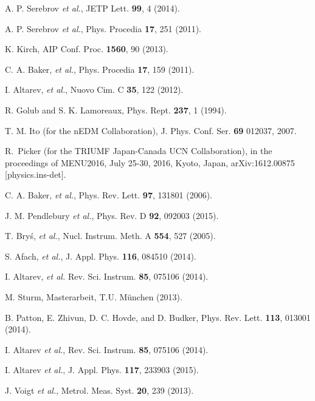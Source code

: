 \documentclass[review]{elsarticle}
\begin{document}

\begin{thebibliography}{00}

 A. P. Serebrov {\it et al.}, JETP Lett. {\bf 99}, 4
  (2014).

 A. P. Serebrov {\it et al.}, Phys. Procedia {\bf
  17}, 251 (2011).

 K. Kirch, AIP Conf. Proc. {\bf 1560}, 90 (2013).

 C. A. Baker, {\it et al.}, Phys. Procedia {\bf
  17}, 159 (2011).

 I. Altarev, {\it et al.}, Nuovo Cim. C {\bf
  35}, 122 (2012).

 R. Golub and S. K. Lamoreaux, Phys. Rept.  {\bf
  237}, 1 (1994).

 T. M. Ito (for the nEDM Collaboration),
  J. Phys. Conf. Ser. {\bf 69} 012037, 2007.

 R.~Picker (for the TRIUMF Japan-Canada UCN
  Collaboration), in the proceedings of MENU2016, July 25-30, 2016,
  Kyoto, Japan, arXiv:1612.00875 [physics.ins-det].

 C. A. Baker, {\it et al.}, Phys. Rev. Lett. {\bf
  97}, 131801 (2006).

 J. M. Pendlebury {\it et al.}, Phys. Rev. D
  {\bf 92}, 092003 (2015).

 T. Bry\'s, {\it et al.}, Nucl. Instrum. Meth. A
  {\bf 554}, 527 (2005).

 S. Afach, {\it et al.}, J. Appl. Phys. {\bf 116},
  084510 (2014).

 I. Altarev, {\it et al.}
  Rev. Sci. Instrum. {\bf 85}, 075106 (2014).

 M. Sturm, Masterarbeit, T.U. M\"unchen
  (2013).

 B. Patton, E. Zhivun, D. C. Hovde, and D. Budker,
  Phys. Rev. Lett. {\bf 113}, 013001 (2014).


 I. Altarev {\it et al.},
  Rev. Sci. Instrum. {\bf 85}, 075106 (2014).


 I. Altarev {\it et al.}, J. Appl. Phys. {\bf 117}, 233903 (2015).



 J. Voigt {\it et al.}, Metrol. Meas. Syst. {\bf 20}, 239 (2013).


\end{thebibliography}
\end{document}
